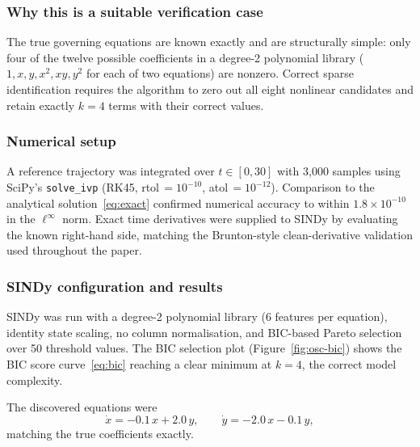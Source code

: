 \documentclass[12pt]{article}
\begin{document}
\subsubsection*{Why this is a suitable verification case}

The true governing equations are known exactly and are structurally simple:
only four of the twelve possible coefficients in a degree-2 polynomial library
($1, x, y, x^{2}, xy, y^{2}$ for each of two equations) are nonzero.
Correct sparse identification requires the algorithm to zero out all eight
nonlinear candidates and retain exactly $k = 4$ terms with their correct
values.

\subsubsection*{Numerical setup}

A reference trajectory was integrated over $t \in [0, 30]$ with 3{,}000
samples using SciPy's \texttt{solve\_ivp}
(RK45, rtol\,$= 10^{-10}$, atol\,$= 10^{-12}$).
Comparison to the analytical solution~\eqref{eq:exact} confirmed numerical
accuracy to within $1.8 \times 10^{-10}$ in the $\ell^{\infty}$ norm.
Exact time derivatives were supplied to SINDy by evaluating the known
right-hand side, matching the Brunton-style clean-derivative validation
used throughout the paper.

\subsubsection*{SINDy configuration and results}

SINDy was run with a degree-2 polynomial library (6 features per equation),
identity state scaling, no column normalisation, and BIC-based Pareto
selection over 50 threshold values.  The BIC selection plot
(Figure~\ref{fig:osc-bic}) shows the BIC score curve~\eqref{eq:bic}
reaching a clear minimum at $k = 4$, the correct model complexity.

The discovered equations were
\begin{equation}
  \dot{x} = -0.1\,x + 2.0\,y, \qquad \dot{y} = -2.0\,x - 0.1\,y,
  \label{eq:osc-disc}
\end{equation}
matching the true coefficients exactly.
\end{document}
